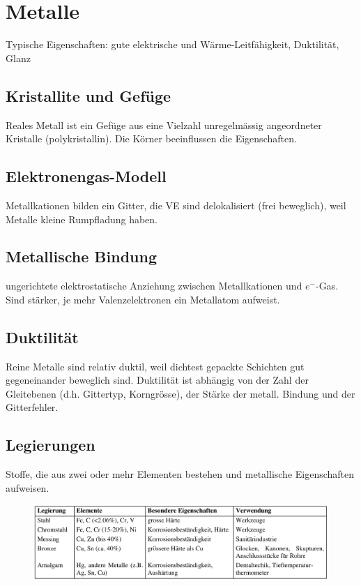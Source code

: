 \section{Metalle}
Typische Eigenschaften: gute elektrische und Wärme-Leitfähigkeit, Duktilität, Glanz

\subsection{Kristallite und Gefüge}
Reales Metall ist ein Gefüge aus eine Vielzahl unregelmässig angeordneter Kristalle (polykristallin). Die Körner beeinflussen die Eigenschaften.

\subsection{Elektronengas-Modell}
Metallkationen bilden ein Gitter, die VE sind delokalisiert (frei beweglich), weil Metalle kleine Rumpfladung haben. 

\subsection{Metallische Bindung}
ungerichtete elektrostatische Anziehung zwischen Metallkationen und $e^-$-Gas. Sind stärker, je mehr Valenzelektronen ein Metallatom aufweist.

\subsection{Duktilität}
Reine Metalle sind relativ duktil, weil dichtest gepackte Schichten gut gegeneinander beweglich sind. Duktilität ist abhängig von der Zahl der Gleitebenen (d.h. Gittertyp, Korngrösse), der Stärke der metall. Bindung und der Gitterfehler. 

\subsection{Legierungen}
Stoffe, die aus zwei oder mehr Elementen bestehen und metallische Eigenschaften aufweisen.

\begin{figure}[h!]
	\centering
	\includegraphics[width=1\linewidth]{images/3_Legierungen.png}
\end{figure}

